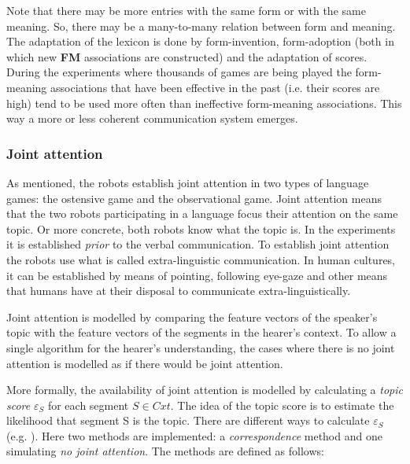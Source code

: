 Note that there may be more entries with the same form or with the same meaning. So, there may be a many-to-many relation between form and meaning. The adaptation of the lexicon is done by form-invention, form-adoption (both in which new {\bf FM} associations are constructed) and the adaptation of scores. During the experiments where thousands of games are being played the form-meaning associations that have been effective in the past (i.e. their scores are high) tend to be used more often than ineffective form-meaning associations. This way a more or less coherent communication system emerges.

\subsubsection{Joint attention}

As mentioned, the robots establish joint attention in two types of language games: the ostensive game and the observational game. Joint attention means that the two robots participating in a language focus their attention on the same topic. Or more concrete, both robots know what the topic is. In the experiments it is established {\em prior} to the verbal communication. To establish joint attention the robots use what is called extra-linguistic communication. In human cultures, it can be established by means of pointing, following eye-gaze and other means that humans have at their disposal to communicate extra-linguistically.


Joint attention is modelled by comparing the feature vectors of the speaker's topic with the feature vectors of the segments in the hearer's context. To allow a single algorithm for the hearer's understanding, the cases where there is no joint attention is modelled as if there would be joint attention. 

More formally, the availability of joint attention is modelled by calculating a {\em topic score} $\varepsilon_S$ for each segment $S \in Cxt$. The idea of the topic score is to estimate the likelihood that segment S is the topic. There are different ways to calculate $\varepsilon_S$ (e.g. \citealt{vogt:1998c}). Here two methods are implemented: a {\em correspondence} method and one simulating {\em no joint attention}. The methods are defined as follows:

